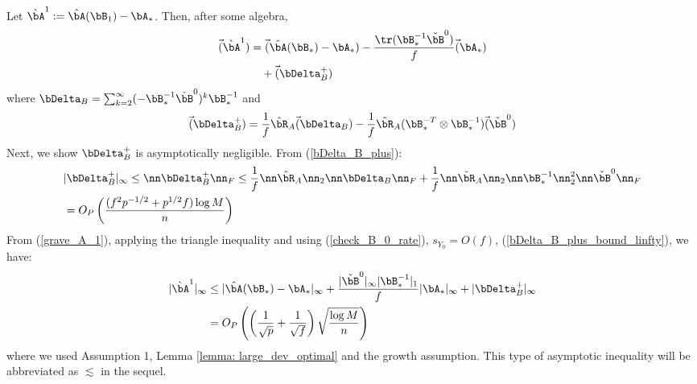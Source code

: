 \begin{IEEEproof}
Let $\grave{\bA}^1:=\hat{\bA}(\bB_1) - \bA_*$. Then, after some algebra,
\begin{align}
	\vec(\grave{\bA}^1) %
		&= \vec(\hat{\bA}(\bB_*)-\bA_*) - \frac{\tr(\bB_*^{-1} \check{\bB}^0)}{f} \vec(\bA_*) \nonumber \\
		&\quad + \vec(\bDelta_B^+) \label{grave_A_1}
\end{align}
where $\bDelta_B = \sum_{k=2}^\infty (-\bB_*^{-1} \check{\bB}^0)^k \bB_*^{-1}$ and 
\begin{equation} \label{bDelta_B_plus}
	\vec(\bDelta_B^+) = \frac{1}{f}\hat{\bR}_A \vec(\bDelta_B) - \frac{1}{f} \tilde{\bR}_A (\bB_*^{-T}\otimes \bB_*^{-1}) \vec(\check{\bB}^0)
\end{equation}
Next, we show $\bDelta_B^+$ is asymptotically negligible. From (\ref{bDelta_B_plus}):
\begin{align}
	&|\bDelta_B^+|_\infty \leq \nn \bDelta_B^+ \nn_F \leq \frac{1}{f} \nn \hat{\bR}_A\nn_2 \nn \bDelta_B\nn_F + \frac{1}{f} \nn \tilde{\bR}_A \nn_2 \nn\bB_*^{-1}\nn_2^2 \nn \check{\bB}^0\nn_F \nonumber \\
		&= O_P\left( \frac{(f^2 p^{-1/2}+p^{1/2}f) \log M}{n} \right) \label{bDelta_B_plus_bound_linfty}
\end{align}
From (\ref{grave_A_1}), applying the triangle inequality and using (\ref{check_B_0_rate}), $s_{Y_0}=O(f)$, (\ref{bDelta_B_plus_bound_linfty}), we have:
\begin{align}
	|\grave{\bA}^1|_\infty %
		&\leq |\hat{\bA}(\bB_*)-\bA_*|_\infty + \frac{|\check{\bB}^0|_\infty |\bB_*^{-1}|_1}{f} |\bA_*|_\infty + |\bDelta_B^+|_\infty \nonumber \\
		&=O_P\left( \left( \frac{1}{\sqrt{p}} + \frac{1}{\sqrt{f}} \right) \sqrt{\frac{\log M}{n}} \right) \label{grave_A_1_bound}
\end{align}
where we used Assumption 1, Lemma \ref{lemma: large_dev_optimal} and the growth assumption. This type of asymptotic inequality will be abbreviated as $\lesssim$ in the sequel.


\end{IEEEproof}
